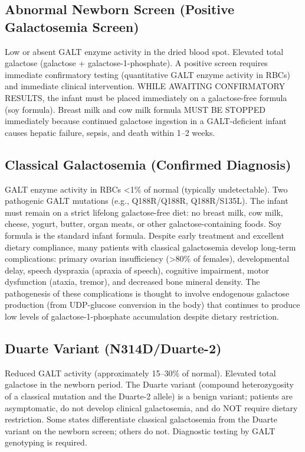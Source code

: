 \subsection*{Abnormal Newborn Screen (Positive Galactosemia Screen)}
Low or absent GALT enzyme activity in the dried blood spot. Elevated total galactose (galactose + galactose-1-phosphate). A positive screen requires immediate confirmatory testing (quantitative GALT enzyme activity in RBCs) and immediate clinical intervention. WHILE AWAITING CONFIRMATORY RESULTS, the infant must be placed immediately on a galactose-free formula (soy formula). Breast milk and cow milk formula MUST BE STOPPED immediately because continued galactose ingestion in a GALT-deficient infant causes hepatic failure, sepsis, and death within 1--2 weeks.

\subsection*{Classical Galactosemia (Confirmed Diagnosis)}
GALT enzyme activity in RBCs <1\% of normal (typically undetectable). Two pathogenic GALT mutations (e.g., Q188R/Q188R, Q188R/S135L). The infant must remain on a strict lifelong galactose-free diet: no breast milk, cow milk, cheese, yogurt, butter, organ meats, or other galactose-containing foods. Soy formula is the standard infant formula. Despite early treatment and excellent dietary compliance, many patients with classical galactosemia develop long-term complications: primary ovarian insufficiency (>80\% of females), developmental delay, speech dyspraxia (apraxia of speech), cognitive impairment, motor dysfunction (ataxia, tremor), and decreased bone mineral density. The pathogenesis of these complications is thought to involve endogenous galactose production (from UDP-glucose conversion in the body) that continues to produce low levels of galactose-1-phosphate accumulation despite dietary restriction.

\subsection*{Duarte Variant (N314D/Duarte-2)}
Reduced GALT activity (approximately 15--30\% of normal). Elevated total galactose in the newborn period. The Duarte variant (compound heterozygosity of a classical mutation and the Duarte-2 allele) is a benign variant; patients are asymptomatic, do not develop clinical galactosemia, and do NOT require dietary restriction. Some states differentiate classical galactosemia from the Duarte variant on the newborn screen; others do not. Diagnostic testing by GALT genotyping is required.

